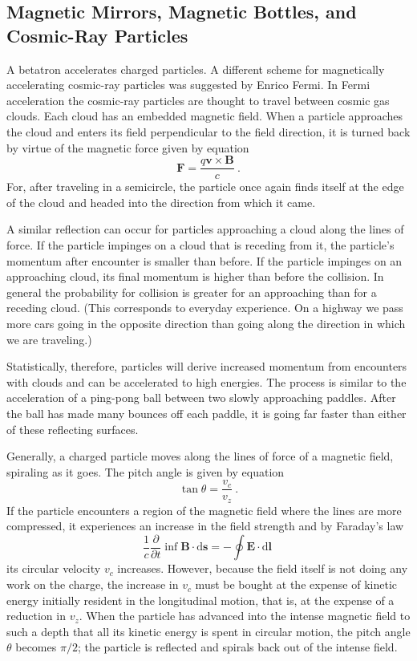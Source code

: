 \documentclass[12pt,a4paper]{article}
\renewcommand{\vec}[1]{\boldsymbol{#1}}
\newcommand{\dif}{\mathrm{d}}
\begin{document}
\subsection{Magnetic Mirrors, Magnetic Bottles, and Cosmic-Ray Particles}
\cite{harwit2006astrophysical} A betatron accelerates charged particles. A different scheme for magnetically accelerating cosmic-ray particles was suggested by Enrico Fermi. In Fermi acceleration the cosmic-ray particles are thought to travel between cosmic gas clouds. Each cloud has an embedded magnetic field. When a particle approaches the cloud and enters its field perpendicular to the field direction, it is turned back by virtue of the magnetic force given by equation 
\begin{equation}
\vec{F} = \dfrac{q \vec{v} \times \vec{B}}{c} ~.
\end{equation}
For, after traveling in a semicircle, the particle once again finds itself at the edge of the cloud and headed into the direction from which it came.

A similar reflection can occur for particles approaching a cloud along the lines of force. If the particle impinges on a cloud that is receding from it, the particle's momentum after encounter is smaller than before. If the particle impinges on an approaching cloud, its final momentum is higher than before the collision. In general the probability for collision is greater for an approaching than for a receding cloud. (This corresponds to everyday experience. On a highway we pass more cars going in the opposite direction than going along the direction in which we are traveling.)

Statistically, therefore, particles will derive increased momentum from encounters with clouds and can be accelerated to high energies. The process is similar to the acceleration of a ping-pong ball between two slowly approaching paddles. After the ball has made many bounces off each paddle, it is going far faster than either of these reflecting surfaces.

Generally, a charged particle moves along the lines of force of a magnetic field, spiraling as it goes. The pitch angle is given by equation 
\begin{equation}
\tan \theta = \dfrac{v_c}{v_z} ~.
\end{equation}
If the particle encounters a region of the magnetic field where the lines are more compressed, it experiences an increase in the field strength and by Faraday's law 
\begin{equation}
\dfrac{1}{c} \dfrac{\partial }{\partial t} \inf \vec{B} \cdot \dif \vec{s} = - \oint \vec{E} \cdot \dif \vec{l} ~
\end{equation}
its circular velocity $v_c$ increases. However, because the field itself is not doing any work on the charge, the increase in $v_c$ must be bought at the expense of kinetic energy initially resident in the longitudinal motion, that is, at the expense of a reduction in $v_z$. When the particle has advanced into the intense magnetic field to such a depth that all its kinetic energy is spent in circular motion, the pitch angle $\theta$ becomes $\pi/2$; the particle is reflected and spirals back out of the intense field.
\end{document}
